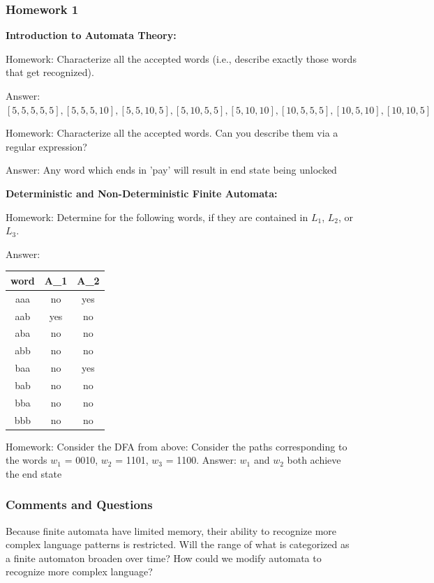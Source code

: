 \documentclass{article}
\theoremstyle{theorem}
\theoremstyle{definition}
\theoremstyle{remark}
\begin{document}
\subsubsection*{Homework 1}

\textbf{Introduction to Automata Theory:}

Homework: Characterize all the accepted words (i.e., describe exactly those words that get recognized).

Answer:  $[5, 5, 5, 5, 5], [5, 5, 5, 10], [5, 5, 10, 5], [5, 10, 5, 5], [5, 10, 10], [10, 5, 5, 5], [10, 5, 10], [10, 10, 5]$

Homework: Characterize all the accepted words. Can you describe them via a regular expression?

Answer: Any word which ends in 'pay' will result in end state being unlocked

\textbf{Deterministic and Non-Deterministic Finite Automata:}

Homework: Determine for the following words, if they are contained in $L_{1}$, $L_{2}$, or $L_{3}$.

Answer:
\begin{table}[!ht]
  \centering
  \begin{tabular}{||c c c||} 
   \hline
   word & A\_1 & A\_2 \\ [0.5ex] 
   \hline\hline
   aaa & no  & yes  \\ 
   aab & yes  & no  \\
   aba & no  & no  \\
   abb & no  & no  \\
   baa & no  & yes \\ 
   bab & no & no \\
   bba & no & no \\
   bbb & no & no \\ [1ex] 
   \hline
  \end{tabular}
  \end{table}

Homework: Consider the DFA from above: Consider the paths corresponding to the words $w_{1}$ = 0010, $w_{2}$ = 1101, $w_{3}$ = 1100.\newline
Answer: $w_{1}$ and $w_{2}$ both achieve the end state

\subsubsection*{Comments and Questions}
Because finite automata have limited memory, their ability to recognize more complex language patterns is restricted. Will the range of what is categorized as a finite automaton broaden over time? How could we modify automata to recognize more complex language?
\end{document}
